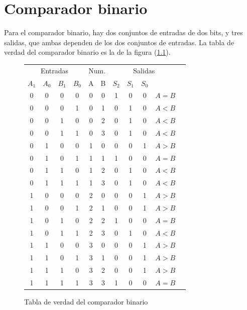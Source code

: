 \documentclass[chaptersright]{informeutn}
\begin{document}
  \chapter{Comparador binario}
    Para el comparador binario, hay dos conjuntos de entradas de dos bits, y tres salidas, que ambas dependen de los
    dos conjuntos de entradas. La tabla de verdad del comparador binario es la de la figura (\ref{tt.bin.comp}).
    \begin{figure}[!ht]
      \centering
      \begin{tabular}{|c|c|c|c|c|c||c|c|c|c|c|}
        \hline
        \multicolumn{4}{|c}{Entradas} & \multicolumn{2}{|c||}{Num.} & \multicolumn{4}{c|}{Salidas} \\
        $A_1$ & $A_0$ & $B_1$ & $B_0$ & A & B & $S_2$ & $S_1$ & $S_0$ &\\
        \hline
        0     & 0     & 0     & 0     & 0 & 0 & 1     & 0     & 0     & $A=B$\\
        0     & 0     & 0     & 1     & 0 & 1 & 0     & 1     & 0     & $A<B$\\
        0     & 0     & 1     & 0     & 0 & 2 & 0     & 1     & 0     & $A<B$\\
        0     & 0     & 1     & 1     & 0 & 3 & 0     & 1     & 0     & $A<B$\\
        0     & 1     & 0     & 0     & 1 & 0 & 0     & 0     & 1     & $A>B$\\
        0     & 1     & 0     & 1     & 1 & 1 & 1     & 0     & 0     & $A=B$\\
        0     & 1     & 1     & 0     & 1 & 2 & 0     & 1     & 0     & $A<B$\\
        0     & 1     & 1     & 1     & 1 & 3 & 0     & 1     & 0     & $A<B$\\
        1     & 0     & 0     & 0     & 2 & 0 & 0     & 0     & 1     & $A>B$\\
        1     & 0     & 0     & 1     & 2 & 1 & 0     & 0     & 1     & $A>B$\\
        1     & 0     & 1     & 0     & 2 & 2 & 1     & 0     & 0     & $A=B$\\
        1     & 0     & 1     & 1     & 2 & 3 & 0     & 1     & 0     & $A<B$\\
        1     & 1     & 0     & 0     & 3 & 0 & 0     & 0     & 1     & $A>B$\\
        1     & 1     & 0     & 1     & 3 & 1 & 0     & 0     & 1     & $A>B$\\
        1     & 1     & 1     & 0     & 3 & 2 & 0     & 0     & 1     & $A>B$\\
        1     & 1     & 1     & 1     & 3 & 3 & 1     & 0     & 0     & $A=B$\\
        \hline
      \end{tabular}
      \caption{Tabla de verdad del comparador binario}
      \label{tt.bin.comp}
    \end{figure}
\end{document}
